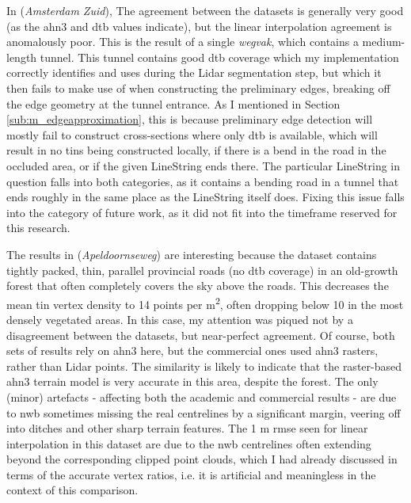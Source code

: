 In  (\textit{Amsterdam Zuid}), The agreement between the datasets is generally very good (as the \ac{ahn3} and \ac{dtb} values indicate), but the linear interpolation agreement is anomalously poor. This is the result of a single \textit{wegvak}, which contains a medium-length tunnel. This tunnel contains good \ac{dtb} coverage which my implementation correctly identifies and uses during the Lidar segmentation step, but which it then fails to make use of when constructing the preliminary edges, breaking off the edge geometry at the tunnel entrance. As I mentioned in Section \ref{sub:m_edgeapproximation}, this is because preliminary edge detection will mostly fail to construct cross-sections where only \ac{dtb} is available, which will result in no \ac{tin}s being constructed locally, if there is a bend in the road in the occluded area, or if the given LineString ends there. The particular LineString in question falls into both categories, as it contains a bending road in a tunnel that ends roughly in the same place as the LineString itself does. Fixing this issue falls into the category of future work, as it did not fit into the timeframe reserved for this research.

The results in  (\textit{Apeldoornseweg}) are interesting because the dataset contains tightly packed, thin, parallel provincial roads (no \ac{dtb} coverage) in an old-growth forest that often completely covers the sky above the roads. This decreases the mean \ac{tin} vertex density to 14 points per m\textsuperscript{2}, often dropping below 10 in the most densely vegetated areas. In this case, my attention was piqued not by a disagreement between the datasets, but near-perfect agreement. Of course, both sets of results rely on \ac{ahn3} here, but the commercial ones used \ac{ahn3} rasters, rather than Lidar points. The similarity is likely to indicate that the raster-based \ac{ahn3} terrain model is very accurate in this area, despite the forest. The only (minor) artefacts - affecting both the academic and commercial results - are due to \ac{nwb} sometimes missing the real centrelines by a significant margin, veering off into ditches and other sharp terrain features. The 1 m \ac{rmse} seen for linear interpolation in this dataset are due to the \ac{nwb} centrelines often extending beyond the corresponding clipped point clouds, which I had already discussed in terms of the accurate vertex ratios, i.e. it is artificial and meaningless in the context of this comparison.

